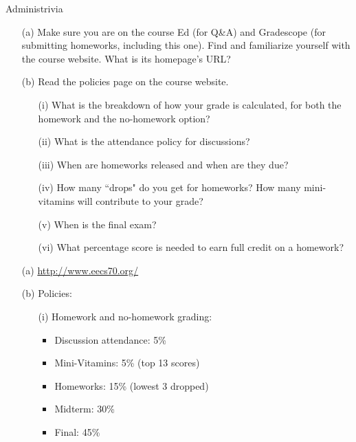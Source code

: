 \begin{homeworkProblem}{Administrivia}
    \begin{itemize}
        \item[(a)] Make sure you are on the course Ed (for Q\&A) and 
        Gradescope (for submitting homeworks, including this one). Find and 
        familiarize yourself with the course website. What is its 
        homepage’s URL?
        \item[(b)] Read the policies page on the course website.
            \begin{itemize}
                \item[(i)] What is the breakdown of how your grade is 
                calculated, for both the homework and the no-homework 
                option? 
                \item[(ii)] What is the attendance policy for discussions?
                \item[(iii)] When are homeworks released and when are they 
                due? 
                \item[(iv)] How many ``drops" do you get for homeworks? How 
                many mini-vitamins will contribute to your grade? 
                \item[(v)] When is the final exam?
                \item[(vi)] What percentage score is needed to earn full 
                credit on a homework?
            \end{itemize}
    \end{itemize}

    \solution

    \begin{itemize}
        \item[(a)] \href{http://www.eecs70.org/}{http://www.eecs70.org/}
        \item[(b)] Policies:
            \begin{itemize}
                \item[(i)] Homework and no-homework grading:
                    \begin{multicols}{2}
                        \begin{itemize}
                            \item Discussion attendance: 5\%
                            \item Mini-Vitamins: 5\% (top 13 scores)
                            \item Homeworks: 15\% (lowest 3 dropped)
                            \item Midterm: 30\%
                            \item Final: 45\%
                        \end{itemize}
                        

\end{multicols}
\end{itemize}
\end{itemize}
\end{homeworkProblem}
